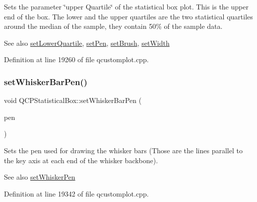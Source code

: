 Sets the parameter \char`\"{}upper Quartile\char`\"{} of the statistical box plot. This is the upper end of the box. The lower and the upper quartiles are the two statistical quartiles around the median of the sample, they contain 50\% of the sample data.

\begin{DoxySeeAlso}{See also}
\hyperlink{class_q_c_p_statistical_box_a680941af5e23d902013962fa67223f9e}{set\+Lower\+Quartile}, \hyperlink{class_q_c_p_abstract_plottable_ab74b09ae4c0e7e13142fe4b5bf46cac7}{set\+Pen}, \hyperlink{class_q_c_p_abstract_plottable_a7a4b92144dca6453a1f0f210e27edc74}{set\+Brush}, \hyperlink{class_q_c_p_statistical_box_a0b62775bd67301b1eba5c785f2b26f14}{set\+Width} 
\end{DoxySeeAlso}


Definition at line 19260 of file qcustomplot.\+cpp.

\mbox{\label{class_q_c_p_statistical_box_aa8d3e503897788e1abf68dc74b5f147f}} 
\subsubsection{\texorpdfstring{set\+Whisker\+Bar\+Pen()}{setWhiskerBarPen()}}
{\footnotesize\ttfamily void Q\+C\+P\+Statistical\+Box\+::set\+Whisker\+Bar\+Pen (\begin{DoxyParamCaption}\item[{const Q\+Pen \&}]{pen }\end{DoxyParamCaption})}

Sets the pen used for drawing the whisker bars (Those are the lines parallel to the key axis at each end of the whisker backbone).

\begin{DoxySeeAlso}{See also}
\hyperlink{class_q_c_p_statistical_box_a4a5034cb3b9b040444df05ab1684620b}{set\+Whisker\+Pen} 
\end{DoxySeeAlso}


Definition at line 19342 of file qcustomplot.\+cpp.

\mbox{\label{class_q_c_p_statistical_box_a4a5034cb3b9b040444df05ab1684620b}} 
